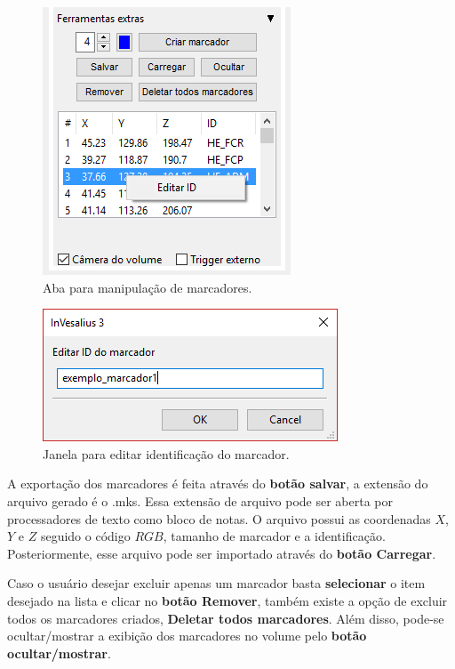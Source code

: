 \begin{figure}[!htb]
\centering
\includegraphics[scale=0.6]{../user_guide_figures/invesalius_screen/nav_id_list_markers_pt.png}
\caption{Aba para manipulação de marcadores.}
\label{fig:nav_id_list_markers}
\end{figure} 

\begin{figure}[!htb]
\centering
\includegraphics[scale=0.6]{../user_guide_figures/invesalius_screen/nav_edit_id_markers_pt.png}
\caption{Janela para editar identificação do marcador.}
\label{fig:nav_edit_id_markers}
\end{figure} 

A exportação dos marcadores é feita através do \textbf{botão salvar}, a extensão do arquivo gerado é o .mks. Essa extensão de arquivo pode ser aberta por processadores de texto como bloco de notas. O arquivo possui as coordenadas $X$, $Y$ e $Z$ seguido o código $RGB$, tamanho de marcador e a identificação. Posteriormente, esse arquivo pode ser importado através do \textbf{botão Carregar}.

Caso o usuário desejar excluir apenas um marcador basta \textbf{selecionar} o item desejado na lista e clicar no \textbf{botão Remover}, também existe a opção de excluir todos os marcadores criados, \textbf{Deletar todos marcadores}. Além disso, pode-se ocultar/mostrar a exibição dos marcadores no volume pelo \textbf{botão ocultar/mostrar}.

